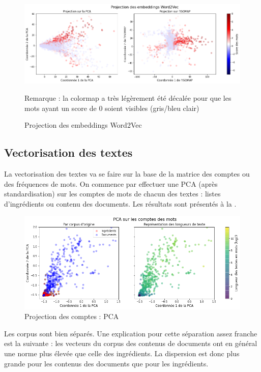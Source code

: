            \begin{figure}[htbp]
                \begin{center}
                \includegraphics[width=0.9\linewidth]{img/word2vec_projection.png}
                \end{center}
                Remarque : la colormap a très légèrement été décalée pour que les mots ayant un score de 0 soient visibles (gris/bleu clair)
                \caption{Projection des embeddings Word2Vec}
                \label{fig:word2vec_projection}
            \end{figure}            

            \subsection{Vectorisation des textes}

            La vectorisation des textes va se faire sur la base de la matrice des comptes ou des fréquences de mots.
            On commence par effectuer une PCA (après standardisation) sur les comptes de mots de chacun des textes : listes d'ingrédients ou contenu des documents.
            Les résultats sont présentés à la .            
            \begin{figure}[htbp]
                \begin{center}
                \includegraphics[width=0.9\linewidth]{img/PCA_counts.png}
                \end{center}
                \caption{Projection des comptes : PCA}
                \label{fig:PCA_counts}
            \end{figure}
            Les corpus sont bien séparés. 
            Une explication pour cette séparation assez franche est la suivante : les vecteurs du corpus des contenus de documents ont en général une norme plus élevée que celle des ingrédients.
            La dispersion est donc plus grande pour les contenus des documents que pour les ingrédients.            


